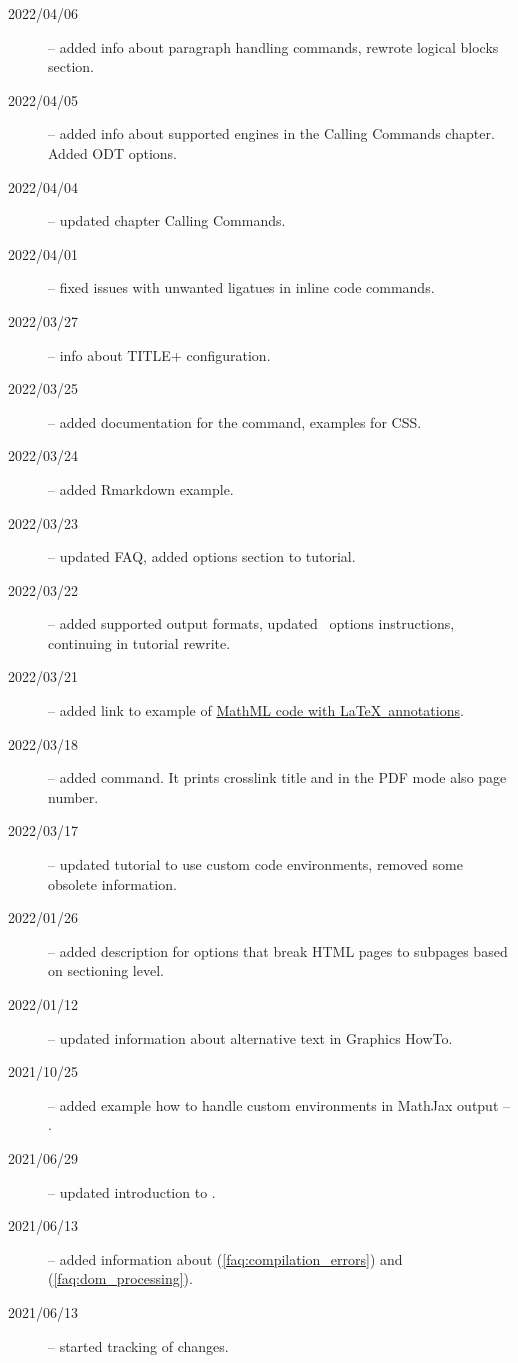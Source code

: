\begin{description}
  \item[2022/04/06] -- added info about paragraph handling commands, rewrote logical blocks section.
  \item[2022/04/05] -- added info about supported engines in the Calling Commands chapter. Added ODT options.
  \item[2022/04/04] -- updated chapter Calling Commands.
  \item[2022/04/01] -- fixed issues with unwanted ligatues in inline code commands.
  \item[2022/03/27] -- info about TITLE+ configuration.
  \item[2022/03/25] -- added documentation for the  command, examples for CSS.
  \item[2022/03/24] -- added Rmarkdown example.
  \item[2022/03/23] -- updated FAQ, added options section to tutorial.
  \item[2022/03/22] -- added supported output formats, updated \fourhtsty\ options instructions, continuing in tutorial rewrite.
  \item[2022/03/21] -- added link to example of \href{https://tex.stackexchange.com/a/637910/2891}{MathML code with \LaTeX\ annotations}.
  \item[2022/03/18] -- added \texcommand{\namerefpage} command. It prints crosslink title and in the PDF mode also page number.
  \item[2022/03/17] -- updated tutorial to use custom code environments, removed some obsolete information.
  \item[2022/01/26] -- added description for options that break HTML pages to subpages based on sectioning level.
  \item[2022/01/12] -- updated information about alternative text in Graphics HowTo.
  \item[2021/10/25] -- added example how to handle custom environments in MathJax output -- .
  \item[2021/06/29] -- updated introduction to .
  \item[2021/06/13] -- added information  about  (\ref{faq:compilation_errors}) and  (\ref{faq:dom_processing}).
  \item[2021/06/13] -- started tracking of changes.
\end{description}
